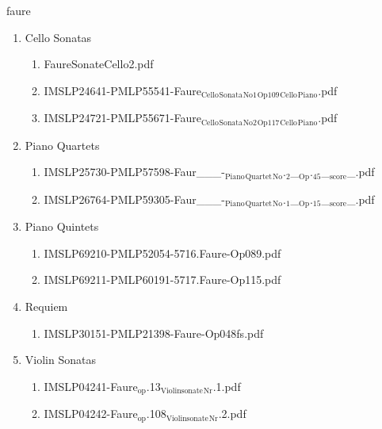 \documentclass[11pt]{article}
\begin{document}
\item faure
\label{sec-1-1-1-1-44-29}
\begin{enumerate}
\item Cello Sonatas
\label{sec-1-1-1-1-44-29-1}
\begin{enumerate}
\item FaureSonateCello2.pdf
\label{sec-1-1-1-1-44-29-1-1}

\item IMSLP24641-PMLP55541-Faure$_{\text{Cello}}$$_{\text{Sonata}}$$_{\text{No1}}$$_{\text{Op109}}$$_{\text{Cello}}$$_{\text{Piano}}$.pdf
\label{sec-1-1-1-1-44-29-1-2}

\item IMSLP24721-PMLP55671-Faure$_{\text{Cello}}$$_{\text{Sonata}}$$_{\text{No2}}$$_{\text{Op117}}$$_{\text{Cello}}$$_{\text{Piano}}$.pdf
\label{sec-1-1-1-1-44-29-1-3}
\end{enumerate}

\item Piano Quartets
\label{sec-1-1-1-1-44-29-2}
\begin{enumerate}
\item IMSLP25730-PMLP57598-Faur\_\_\_-$_{\text{Piano}}$$_{\text{Quartet}}$$_{\text{No}}$.$_{\text{2}}$\_$_{\text{Op}}$.$_{\text{45}}$\_$_{\text{score}}$\_.pdf
\label{sec-1-1-1-1-44-29-2-1}

\item IMSLP26764-PMLP59305-Faur\_\_\_-$_{\text{Piano}}$$_{\text{Quartet}}$$_{\text{No}}$.$_{\text{1}}$\_$_{\text{Op}}$.$_{\text{15}}$\_$_{\text{score}}$\_.pdf
\label{sec-1-1-1-1-44-29-2-2}
\end{enumerate}

\item Piano Quintets
\label{sec-1-1-1-1-44-29-3}
\begin{enumerate}
\item IMSLP69210-PMLP52054-5716.Faure-Op089.pdf
\label{sec-1-1-1-1-44-29-3-1}

\item IMSLP69211-PMLP60191-5717.Faure-Op115.pdf
\label{sec-1-1-1-1-44-29-3-2}
\end{enumerate}

\item Requiem
\label{sec-1-1-1-1-44-29-4}
\begin{enumerate}
\item IMSLP30151-PMLP21398-Faure-Op048fs.pdf
\label{sec-1-1-1-1-44-29-4-1}
\end{enumerate}

\item Violin Sonatas
\label{sec-1-1-1-1-44-29-5}
\begin{enumerate}
\item IMSLP04241-Faure$_{\text{op}}$.13$_{\text{Violinsonate}}$$_{\text{Nr}}$.1.pdf
\label{sec-1-1-1-1-44-29-5-1}

\item IMSLP04242-Faure$_{\text{op}}$.108$_{\text{Violinsonate}}$$_{\text{Nr}}$.2.pdf
\label{sec-1-1-1-1-44-29-5-2}
\end{enumerate}
\end{enumerate}
\end{document}
